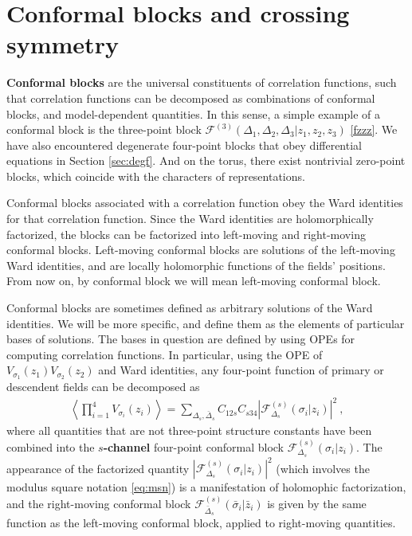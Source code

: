 \documentclass[12pt, a4paper, notitlepage, twoside]{report}
\numberwithin{equation}{section}
\theoremstyle{break}
\begin{document}
\section{Conformal blocks and crossing symmetry \label{secaco}}

\textbf{\boldmath Conformal blocks} are the universal constituents of correlation functions, such that correlation functions can be decomposed as combinations of conformal blocks, and model-dependent quantities.
In this sense, a simple example of a conformal block is the three-point block $\mathcal{F}^{(3)}(\Delta_1,\Delta_2,\Delta_3|z_1,z_2,z_3)$ \eqref{fzzz}. 
We have also encountered degenerate four-point blocks that obey differential equations in Section \ref{sec:degf}.
And on the torus, there exist nontrivial zero-point blocks, which coincide with the characters of representations. 

Conformal blocks associated with a correlation function obey the Ward identities for that correlation function. 
Since the Ward identities are holomorphically factorized, the blocks can be factorized into left-moving and right-moving conformal blocks. Left-moving conformal blocks are solutions of the left-moving Ward identities, and are locally holomorphic functions of the fields' positions. From now on, by conformal block we will mean left-moving conformal block. 

Conformal blocks are sometimes defined as arbitrary solutions of the Ward identities. We will be more specific, and define them as the elements of particular bases of solutions. The bases in question are defined by using OPEs for computing correlation functions. In particular, using the OPE of $V_{\sigma_1}(z_1)V_{\sigma_2}(z_2)$ and Ward identities, any four-point function of primary or descendent fields can be decomposed as 
\begin{align}
 \left\langle \prod_{i=1}^4 V_{\sigma_i}(z_i)\right\rangle 
 = \sum_{\Delta_s,\bar{\Delta}_s} C_{12s} C_{s34} \left| \mathcal{F}^{(s)}_{\Delta_s}(\sigma_i|z_i)\right|^2\ ,
\label{fsd}
\end{align}
where all quantities that are not three-point structure constants have been combined into the \textbf{\boldmath $s$-channel} four-point conformal block $\mathcal{F}^{(s)}_{\Delta_s}(\sigma_i|z_i)$.
The appearance of the factorized quantity $\left| \mathcal{F}^{(s)}_{\Delta_s}(\sigma_i|z_i)\right|^2 $ (which involves the modulus square notation \eqref{eq:msn}) is a manifestation of holomophic factorization, and the right-moving conformal block $\mathcal{F}^{(s)}_{\bar\Delta_s}(\bar\sigma_i|\bar z_i)$ is given by the same function as the left-moving conformal block, applied to right-moving quantities.
\end{document}
